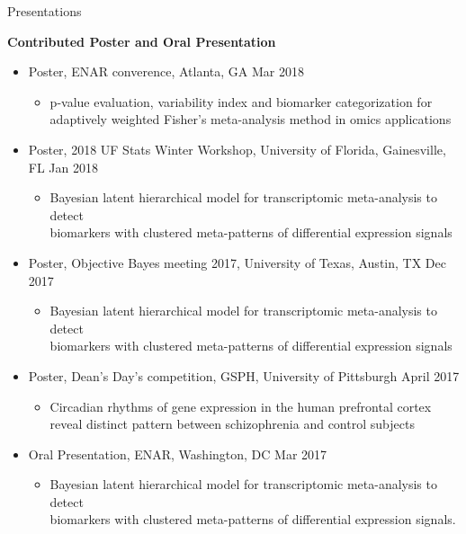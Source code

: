 \documentclass{resume} %
\begin{document}
\begin{rSection}{Presentations}
\begin{itemize}[noitemsep,topsep=0pt]
\end{itemize}


\textbf{Contributed Poster and Oral Presentation}

\begin{itemize}[noitemsep,topsep=0pt]


\item  Poster, ENAR converence, Atlanta, GA \hfill {Mar 2018}
\begin{itemize}[noitemsep,topsep=0pt]
\item{p-value evaluation, variability index and biomarker categorization for \\adaptively
weighted Fisher's meta-analysis method in omics applications}
\end{itemize}


\item  Poster, 2018 UF Stats Winter Workshop, University of Florida, Gainesville, FL \hfill {Jan 2018}
\begin{itemize}[noitemsep,topsep=0pt]
\item{Bayesian latent hierarchical model for transcriptomic meta-analysis to detect\\ biomarkers with clustered meta-patterns of differential expression signals}
\end{itemize}

\item  Poster, Objective Bayes meeting 2017, University of Texas, Austin, TX \hfill {Dec 2017}
\begin{itemize}[noitemsep,topsep=0pt]
\item{Bayesian latent hierarchical model for transcriptomic meta-analysis to detect\\ biomarkers with clustered meta-patterns of differential expression signals}
\end{itemize}

\item  Poster, Dean's Day's competition, GSPH, University of Pittsburgh \hfill {April 2017}
\begin{itemize}[noitemsep,topsep=0pt]
\item{Circadian rhythms of gene expression in the human prefrontal cortex \\reveal distinct pattern between schizophrenia and control subjects}
\end{itemize}

\item Oral Presentation, ENAR, Washington, DC \hfill {Mar 2017}
\begin{itemize}[noitemsep,topsep=0pt]
\item{Bayesian latent hierarchical model for transcriptomic meta-analysis to detect\\ biomarkers with clustered meta-patterns of differential expression signals.}
\end{itemize}





\end{itemize}
\end{rSection}
\end{document}
